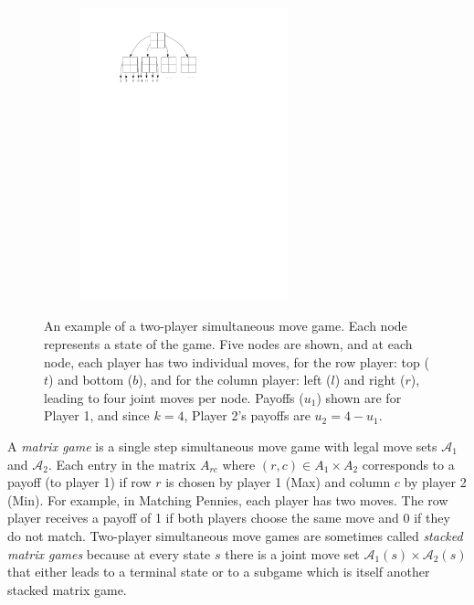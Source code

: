 \documentclass[conference]{IEEEtran}
\newcommand{\cA}{\mathcal{A}}
\begin{document}
\begin{figure}[t!]
\centering
\begin{subfigure}{6cm}
\centering
\includegraphics[width=6.0cm]{figures/tree2}\\
\end{subfigure}
\caption{An example of a two-player simultaneous move game. Each node represents a state of 
the game. Five nodes are shown, and at each node, each player has two individual moves, for the row player: top ($t$) and bottom ($b$), 
and for the column player: left ($l$) and right ($r$), leading to four joint moves per node.
Payoffs ($u_1$) shown are for Player 1, and since $k = 4$, Player 2's payoffs are $u_2 = 4 - u_1$. 
\label{fig:example}}
\end{figure}

A {\it matrix game} is a single step simultaneous move game with legal move sets $\cA_1$ and $\cA_2$. 
Each entry in the matrix $A_{rc}$ where $(r,c) \in A_1 \times A_2$ corresponds to a payoff (to player 1) if row $r$ is chosen by 
player 1 (Max) and column $c$ by player 2 (Min). 
For example, in Matching Pennies, each player has two moves. The row player receives a payoff of 1 if both 
players choose the same move and 0 if they do not match. 
Two-player simultaneous move games are sometimes called {\it stacked matrix games} because at every state 
$s$ there is a joint move set $\cA_1(s) \times \cA_2(s)$ that either leads to a terminal state or to a subgame which 
is itself another stacked matrix game. 
\end{document}
